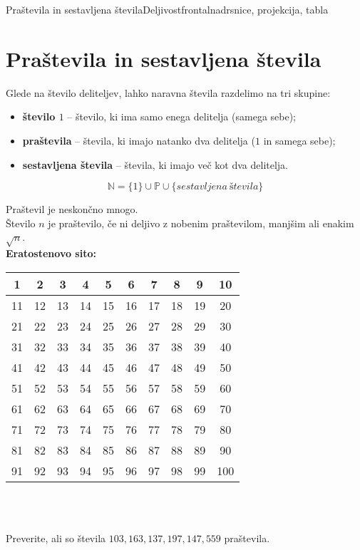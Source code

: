\begin{priprava}{5}{}{Praštevila in sestavljena števila}{Deljivost}{frontalna}{drsnice, projekcija, tabla}


    \section{Praštevila in sestavljena števila}
                
    Glede na število deliteljev, lahko naravna števila razdelimo na tri skupine:
    \begin{itemize}
        \item \textbf{število $1$} -- število, ki ima samo enega delitelja (samega sebe);
        \item \textbf{praštevila} -- števila, ki imajo natanko dva delitelja ($1$ in samega sebe);
        \item \textbf{sestavljena števila} -- števila, ki imajo več kot dva delitelja.
    \end{itemize}
    
    $$ \mathbb{N}=\{1\}\cup \mathbb{P}\cup \{sestavljena~števila\} $$


    Praštevil je neskončno mnogo.
    \\

    Število $n$ je praštevilo, če ni deljivo z nobenim praštevilom, manjšim ali enakim $\sqrt{n}$.
    \\


\textbf{Eratostenovo sito:}
    \begin{longtable}{|c|c|c|c|c|c|c|c|c|c|}
        \hline
        1 & 2 & 3 & 4 & 5 & 6 & 7 & 8 & 9 & 10 \\
        \hline
        11 & 12 & 13 & 14 & 15 & 16 & 17 & 18 & 19 & 20 \\
        \hline
        21 & 22 & 23 & 24 & 25 & 26 & 27 & 28 & 29 & 30 \\
        \hline
        31 & 32 & 33 & 34 & 35 & 36 & 37 & 38 & 39 & 40 \\
        \hline
        41 & 42 & 43 & 44 & 45 & 46 & 47 & 48 & 49 & 50 \\
        \hline
        51 & 52 & 53 & 54 & 55 & 56 & 57 & 58 & 59 & 60 \\
        \hline
        61 & 62 & 63 & 64 & 65 & 66 & 67 & 68 & 69 & 70 \\
        \hline
        71 & 72 & 73 & 74 & 75 & 76 & 77 & 78 & 79 & 80 \\
        \hline
        81 & 82 & 83 & 84 & 85 & 86 & 87 & 88 & 89 & 90 \\
        \hline
        91 & 92 & 93 & 94 & 95 & 96 & 97 & 98 & 99 & 100 \\
        \hline
        \end{longtable}
    

    ~\\~

\begin{naloga}
    Preverite, ali so števila $103, 163, 137, 197, 147, 559$ praštevila.
\end{naloga}
            
 


\end{priprava}
